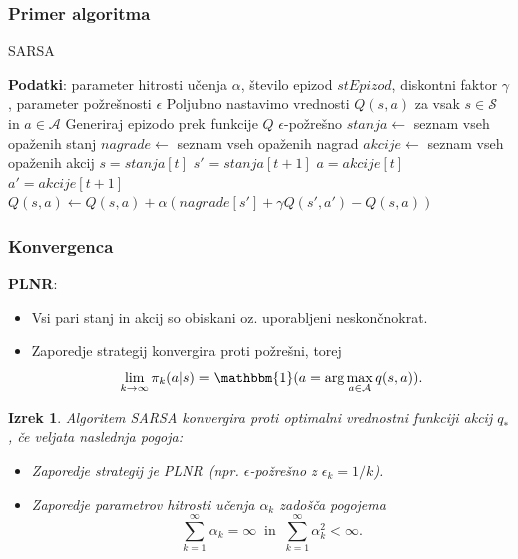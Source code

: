 \documentclass{beamer}    %
\newtheorem{izrek}{Izrek}
\begin{document}
\begin{frame}
    \frametitle{Primer algoritma}
    \begin{algorithm}[H]
        \caption{SARSA}
    \begin{algorithmic}\label{SARSA}
        
        \STATE \textbf{Podatki}: parameter hitrosti učenja $\alpha$, število epizod $stEpizod$, diskontni 
                faktor $\gamma$, parameter požrešnosti $\epsilon$
        \STATE Poljubno nastavimo vrednosti $Q(s, a)$ za vsak $s \in \mathcal{S}$ in $a \in \mathcal{A}$ 
            \STATE Generiraj epizodo prek funkcije $Q$ $\epsilon$-požrešno
            \STATE $stanja \leftarrow$ seznam vseh opaženih stanj
            \STATE $nagrade \leftarrow$ seznam vseh opaženih nagrad
            \STATE $akcije \leftarrow$ seznam vseh opaženih akcij
            \STATE $s = stanja[t]$
            \STATE $s' = stanja[t + 1]$
            \STATE $a = akcije[t]$
            \STATE $a' = akcije[t + 1]$
            \STATE $Q(s, a) \leftarrow Q(s, a) + \alpha (nagrade[s'] + \gamma Q(s', a') - Q(s, a))$ 
            \ENDFOR
        \ENDFOR
    
    \end{algorithmic}
    \end{algorithm}
\end{frame}


\begin{frame}
    \frametitle{Konvergenca}
    \textbf{PLNR}:
    \begin{itemize}
        \item Vsi pari stanj in akcij so obiskani oz. uporabljeni neskončnokrat.
        \item Zaporedje strategij konvergira proti požrešni, torej 
            $$
            \lim_{k \rightarrow \infty} \pi_k(a|s) = \mathbbm{1} (a = \text{arg}\max_{a \in \mathcal{A}} 
                q(s, a)).
            $$
    \end{itemize}
    \begin{izrek}
        Algoritem SARSA konvergira proti optimalni vrednostni funkciji akcij $q_*$, če veljata naslednja 
        pogoja:
        \begin{itemize}
            \item Zaporedje strategij je PLNR (npr. $\epsilon$-požrešno z $\epsilon_k = 1 / k$).
            \item Zaporedje parametrov hitrosti učenja $\alpha_k$ zadošča pogojema
                $$
                \sum_{k=1}^\infty \alpha_k = \infty~\text{ in }~\sum_{k=1}^\infty \alpha_k^2 < \infty.
                $$
        \end{itemize}
    \end{izrek}
\end{frame}
\end{document}
